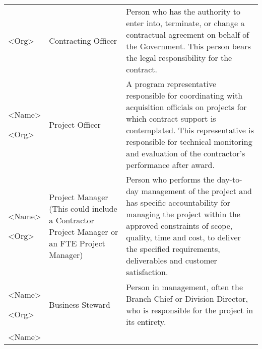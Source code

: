 \documentclass[a4paper, 11pt]{article}
\begin{document}
\begin{longtable}[]{@{}lll@{}}
\begin{minipage}[t]{0.30\columnwidth}
\textless{}Org\textgreater{}\strut
\end{minipage} & \begin{minipage}[t]{0.30\columnwidth}\raggedright
Contracting Officer\strut
\end{minipage} & \begin{minipage}[t]{0.30\columnwidth}\raggedright
Person who has the authority to enter into, terminate, or change a
contractual agreement on behalf of the Government. This person bears the
legal responsibility for the contract.\strut
\end{minipage}\tabularnewline
\begin{minipage}[t]{0.30\columnwidth}\raggedright
\textless{}Name\textgreater{}

\textless{}Org\textgreater{}\strut
\end{minipage} & \begin{minipage}[t]{0.30\columnwidth}\raggedright
Project Officer\strut
\end{minipage} & \begin{minipage}[t]{0.30\columnwidth}\raggedright
A program representative responsible for coordinating with acquisition
officials on projects for which contract support is contemplated. This
representative is responsible for technical monitoring and evaluation of
the contractor's performance after award.\strut
\end{minipage}\tabularnewline
\begin{minipage}[t]{0.30\columnwidth}\raggedright
\textless{}Name\textgreater{}

\textless{}Org\textgreater{}\strut
\end{minipage} & \begin{minipage}[t]{0.30\columnwidth}\raggedright
Project Manager (This could include a Contractor Project Manager or an
FTE Project Manager)\strut
\end{minipage} & \begin{minipage}[t]{0.30\columnwidth}\raggedright
Person who performs the day-to-day management of the project and has
specific accountability for managing the project within the approved
constraints of scope, quality, time and cost, to deliver the specified
requirements, deliverables and customer satisfaction.\strut
\end{minipage}\tabularnewline
\begin{minipage}[t]{0.30\columnwidth}\raggedright
\textless{}Name\textgreater{}

\textless{}Org\textgreater{}\strut
\end{minipage} & \begin{minipage}[t]{0.30\columnwidth}\raggedright
Business Steward\strut
\end{minipage} & \begin{minipage}[t]{0.30\columnwidth}\raggedright
Person in management, often the Branch Chief or Division Director, who
is responsible for the project in its entirety.\strut
\end{minipage}\tabularnewline
\begin{minipage}[t]{0.30\columnwidth}\raggedright
\textless{}Name\textgreater{}


\end{minipage}
\end{longtable}
\end{document}
